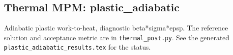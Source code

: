 \subsection{Thermal MPM: plastic\_adiabatic}
Adiabatic plastic work-to-heat, diagnostic beta*sigma*epsp. The reference solution and acceptance metric are in \texttt{thermal\_post.py}. See the generated \texttt{plastic\_adiabatic\_results.tex} for the status.
